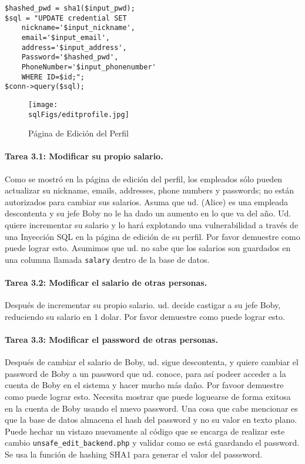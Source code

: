 \begin{lstlisting}
$hashed_pwd = sha1($input_pwd);
$sql = "UPDATE credential SET
	nickname='$input_nickname',
	email='$input_email',
	address='$input_address',
	Password='$hashed_pwd',
	PhoneNumber='$input_phonenumber'
	WHERE ID=$id;";
$conn->query($sql);
\end{lstlisting}
 

\begin{figure}[htb]
\begin{center}
  \texttt{[image: \\sqlFigs/editprofile.jpg]}
\end{center}
\caption{Página de Edición del Perfil}
\label{sql:fig:edit}
\end{figure}
 


\paragraph{Tarea 3.1: Modificar su propio salario.}  
Como se mostró en la página de edición del perfil, los empleados sólo pueden actualizar su nickname, emails, addresses, phone numbers y passwords; no están autorizados para cambiar sus salarios.
Asuma que ud. (Alice) es una empleada descontenta y su jefe Boby no le ha dado un aumento en lo que va del año. Ud. quiere incrementar su salario y lo hará explotando una vulnerabilidad a través de una Inyección SQL en la página de edición de su perfil. Por favor demuestre como puede lograr esto.
Asumimos que ud. no sabe que los salarios son guardados en una columna llamada \texttt{salary} dentro de la base de datos.


\paragraph{Tarea 3.2: Modificar el salario de otras personas.}
Después de incrementar su propio salario. ud. decide castigar a su jefe Boby, reduciendo su salario en 1 dolar. Por favor demuestre como puede lograr esto.

\paragraph{Tarea 3.3: Modificar el password de otras personas.}
Después de cambiar el salario de Boby, ud. sigue descontenta, y quiere cambiar el password de Boby a un password que ud. conoce, para así podeer acceder a la cuenta de Boby en el sistema y hacer mucho más daño. Por favoor demuestre como puede lograr esto.
Necesita mostrar que puede loguearse de forma exitosa en la cuenta de Boby usando el nuevo password. 
Una cosa que cabe mencionar es que la base de datos almacena el hash del password y no su valor en texto plano. Puede hechar un vistazo nuevamente al código que se encarga de realizar este cambio {\tt unsafe\_edit\_backend.php} y validar como se está guardando el password. Se usa la función de hashing SHA1 para generar el valor del passsword.




